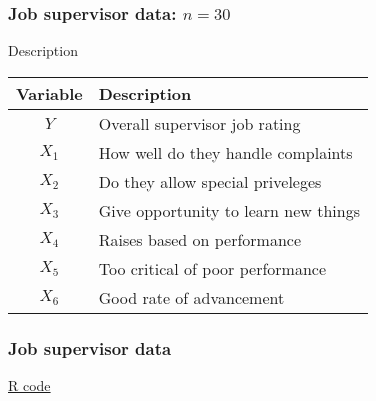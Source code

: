 \documentclass[handout]{beamer}
\begin{document}

   \begin{frame} \frametitle{Job supervisor data: $n=30$}

   \begin{block}
   {Description}

   \begin{tabular}{c|l}
   Variable & Description \\ \hline
   $Y$ & Overall supervisor job rating \\
   $X_1$ & How well do they handle complaints \\
   $X_2$ & Do they allow  special priveleges \\
   $X_3$ & Give opportunity to learn new things \\
   $X_4$ & Raises based on performance \\
   $X_5$ & Too critical of poor performance\\
   $X_6$ & Good rate of advancement \\
   \end{tabular}
   \end{block}
   \end{frame}



   \begin{frame}
   \frametitle{Job supervisor data}
   \begin{center}
   \end{center}
   \href{http://stats191.stanford.edu/multiple.html#job-supervisor-example}{R code}
   \end{frame}

\end{document}
